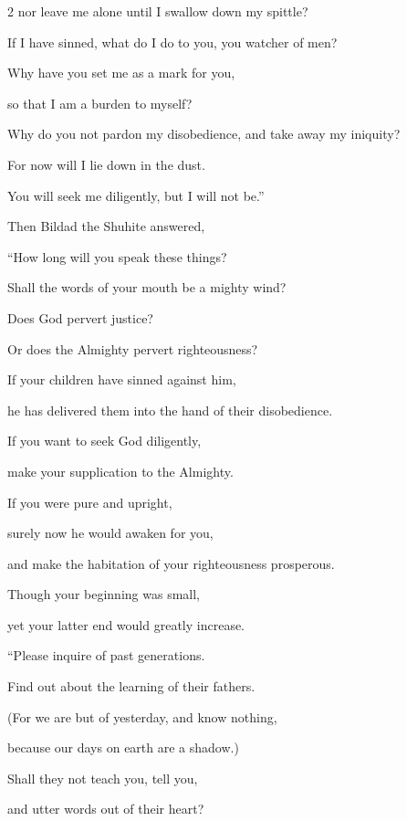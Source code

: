 \begin{multicols}{2}
	nor leave me alone until I swallow down my spittle?
	
	\myverse{}If I have sinned, what do I do to you, you watcher of men?
	
	Why have you set me as a mark for you,
	
	so that I am a burden to myself?
	
	\myverse{}Why do you not pardon my disobedience, and take away my iniquity?
	
	For now will I lie down in the dust.
	
	You will seek me diligently, but I will not be.”
	
	
	\mychapter{} \myverse*{}Then Bildad the Shuhite answered,
	
	\myverse{}“How long will you speak these things?
	
	Shall the words of your mouth be a mighty wind?
	
	\myverse{}Does God pervert justice?
	
	Or does the Almighty pervert righteousness?
	
	\myverse{}If your children have sinned against him,
	
	he has delivered them into the hand of their disobedience.
	
	\myverse{}If you want to seek God diligently,
	
	make your supplication to the Almighty.
	
	\myverse{}If you were pure and upright,
	
	surely now he would awaken for you,
	
	and make the habitation of your righteousness prosperous.
	
	\myverse{}Though your beginning was small,
	
	yet your latter end would greatly increase.
	
	\vspace{\baselineskip}
	
	
	\myverse{}“Please inquire of past generations.
	
	Find out about the learning of their fathers.
	
	\myverse{}(For we are but of yesterday, and know nothing,
	
	because our days on earth are a shadow.)
	
	\myverse{}Shall they not teach you, tell you,
	
	and utter words out of their heart?
	
	\vspace{\baselineskip}
	

\end{multicols}

